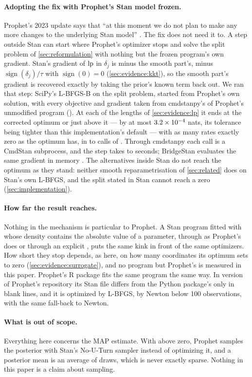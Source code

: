 \paragraph{Adopting the fix with Prophet's Stan model frozen.}
Prophet's 2023 update says that ``at this moment we do not plan to make any more
changes to the underlying Stan model'' \citep{duong2023prophet}. The fix does not
need it to. A step outside Stan can start where Prophet's optimizer stops and solve
the split problem of \cref{sec:reformulation} with nothing but the frozen program's
own gradient. Stan's gradient of $\mathrm{lp}$ in $\delta_j$ is minus the smooth part's,
minus $\operatorname{sign}(\delta_j)/\tau$ with $\operatorname{sign}(0) = 0$
(\cref{sec:evidence:kkt}), so the smooth part's gradient is recovered exactly by
taking the prior's known term back out. We ran that step: SciPy's L-BFGS-B on the split
problem, started from Prophet's own solution, with every objective and gradient taken
from cmdstanpy's  of Prophet's unmodified program
(). At each of the lengths of \cref{sec:evidence:lp}
it ends at the corrected optimum or just above it --- by at most $3.2\times10^{-4}$
nats, its tolerance being tighter than this implementation's default --- with as many
rates exactly zero as the optimum has, in \FrozenCallsMin{} to \FrozenCallsMax{} calls
of . Through cmdstanpy each call is a CmdStan subprocess, and the step takes
\FrozenSecondsMin{} to \FrozenSecondsMax{} seconds; BridgeStan evaluates the same
gradient in memory \citep{roualdes2023bridgestan}. The alternatives inside Stan do not
reach the optimum as they stand: neither smooth reparametrisation of
\cref{sec:related} does on Stan's own L-BFGS, and the split stated in Stan cannot
reach a zero (\cref{sec:implementation}).

\paragraph{How far the result reaches.}
Nothing in the mechanism is particular to Prophet. A Stan program fitted with
 whose density contains the absolute value of a parameter, through
 as Prophet's does or through an explicit , puts
the same kink in front of the same optimizers. How short they stop depends, as here,
on how many coordinates its optimum sets to zero (\cref{sec:evidence:surrogate}), and
no program but Prophet's is measured in this paper. Prophet's R package fits the same
program the same way. In version \EnvProphet{} of Prophet's repository its Stan file
differs from the Python package's only in blank lines, and it is optimized by L-BFGS,
by Newton below 100 observations, with the same fall-back to Newton.

\paragraph{What is out of scope.}
Everything here concerns the MAP estimate. With  above zero,
Prophet samples the posterior with Stan's No-U-Turn sampler instead of optimizing it,
and a posterior mean is an average of draws, which is never exactly sparse. Nothing
in this paper is a claim about sampling.
